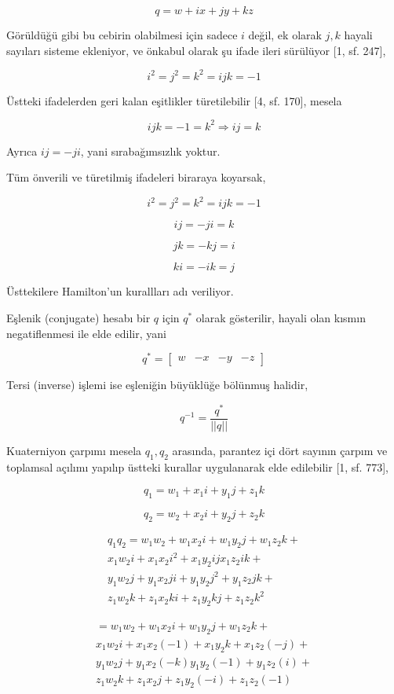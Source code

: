 \documentclass[12pt,fleqn]{article}\usepackage{../../common}
\begin{document}
$$
q = w + i x + j y + k z
$$

Görüldüğü gibi bu cebirin olabilmesi için sadece $i$ değil, ek olarak $j,k$
hayali sayıları sisteme ekleniyor, ve önkabul olarak şu ifade ileri sürülüyor
[1, sf. 247],

$$
i^2 = j^2 = k^2 = ijk = -1
$$

Üstteki ifadelerden geri kalan eşitlikler türetilebilir [4, sf. 170], mesela

$$
ijk = -1 = k^2 \Rightarrow ij = k
$$

Ayrıca $ij = -ji$, yani sırabağımsızlık yoktur.

Tüm önverili ve türetilmiş ifadeleri biraraya koyarsak,

$$
i^2 = j^2 = k^2 = ijk = -1
$$

$$
ij = -ji = k
$$

$$
jk = -kj = i
$$

$$
ki = -ik = j
$$

Üsttekilere Hamilton'un kurallları adı veriliyor.

Eşlenik (conjugate) hesabı bir $q$ için $q^{\ast}$ olarak gösterilir, hayali
olan kısmın negatiflenmesi ile elde edilir, yani

$$
q^{\ast} = [\begin{array}{cccc} w & -x & -y & -z \end{array}]
$$

Tersi (inverse) işlemi ise eşleniğin büyüklüğe bölünmuş halidir,

$$
q^{-1} = \frac{q^{\ast}}{|| q ||}
$$

Kuaterniyon çarpımı mesela $q_1,q_2$ arasında, parantez içi dört sayının çarpım
ve toplamsal açılımı yapılıp üstteki kurallar uygulanarak elde edilebilir
[1, sf. 773],

$$
q_1 = w_1 + x_1 i + y_1 j + z_1 k
$$

$$
q_2 = w_2 + x_2 i + y_2 j + z_2 k 
$$

\begin{align*}
q_1 q_2 =
w_1 w_2 + w_1 x_2 i + w_1 y_2 j + w_1 z_2 k + \\
x_1 w_2 i + x_1 x_2 i^2 + x_1 y_2 ij x_1 z_2 ik + \\
y_1 w_2 j + y_1 x_2 ji + y_1 y_2 j^2 + y_1 z_2 jk + \\
z_1 w_2 k + z_1 x_2 ki + z_1 y_2 kj + z_1 z_2 k^2
\end{align*}

\begin{align*}
= w_1 w_2 + w_1 x_2 i + w_1 y_2 j + w_1 z_2 k + \\
x_1 w_2 i + x_1 x_2 (-1) + x_1 y_2 k + x_1 z_2 (-j) + \\
y_1 w_2 j + y_1 x_2 (-k) y_1 y_2 (-1) + y_1 z_2 (i) + \\
z_1 w_2 k + z_1 x_2 j + z_1 y_2 (-i) + z_1 z_2 (-1)
\end{align*}
\end{document}
